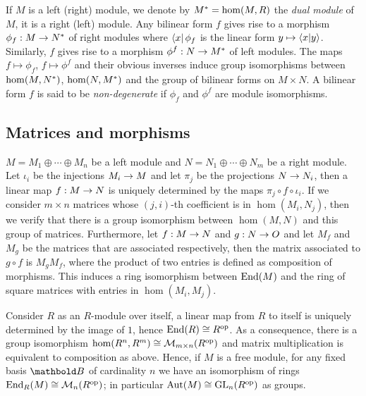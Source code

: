 If $M$ is a left (right) module, we denote by $M^\ast=\hom(M,R)$ the
\textit{dual
  module} of $M$, it is a right (left) module.
Any bilinear form $f$ gives rise to a morphism $ \phi_f : M \rightarrow
N^\ast$ of right modules where $\left\langle x \right\rvert\phi_f$ is the linear form $y
\mapsto \left\langle x \middle| y \right\rangle$. Similarly, $f$ gives rise to a morphism
$\phi^f:N\rightarrow M^\ast$ of left modules. The maps $f\mapsto\phi_f$,
$f\mapsto\phi^f$ and their obvious inverses induce group isomorphisms
between $\hom(M,N^\ast)$, $\hom(N,M^\ast)$ and the group of
bilinear forms on $M\times N$.  A bilinear form $f$ is said to be
\textit{non-degenerate} if $\phi_f$
and $\phi^f$ are module isomorphisms.


\subsection{Matrices and morphisms}
\label{sec:linear-algebra:matrices}
$M=M_1\oplus\cdots\oplus M_n$ be a left module and
$N=N_1\oplus\cdots\oplus N_m$ be a right module.  Let $\iota_i$ be the
injections $M_i\rightarrow M$ and let $\pi_j$ be the projections $N\rightarrow N_i$,
then a linear map $f:M\rightarrow N$ is uniquely determined by the maps
$\pi_j\circ f\circ\iota_i$. If we consider $m\times n$ matrices whose
$(j,i)$-th coefficient is in $\hom(M_i,N_j)$, then we verify that
there is a group isomorphism between $\hom(M,N)$ and this group of
matrices. Furthermore, let $f:M\rightarrow N$ and $g:N\rightarrow O$ and let $M_f$ and
$M_g$ be the matrices that are associated respectively, then the
matrix associated to $g\circ f$ is $M_gM_f$, where the product of two
entries is defined as composition of morphisms. This induces a ring
isomorphism between $\operatorname{End}(M)$ and the ring of square matrices with
entries in $\hom(M_i,M_j)$.

Consider $R$ as an $R$-module over itself, a linear map from $R$ to
itself is uniquely determined by the image of $1$, hence $\operatorname{End}(R)\cong
R^{\mathrm{op}}$. As a consequence, there is a group isomorphism
$\hom(R^n,R^m)\cong\operatorname{\mathcal{M}}_{m\times n}(R^{\mathrm{op}})$ and matrix multiplication
is equivalent to composition as above.  Hence, if $M$ is a free
module, for any fixed basis $\basis{B}$ of cardinality $n$ we have an
isomorphism of rings $\operatorname{End}_R(M)\cong\operatorname{\mathcal{M}}_n(R^{\mathrm{op}})$; in particular
$\operatorname{Aut}(M)\cong\operatorname{GL}_n(R^{\mathrm{op}})$ as groups.

